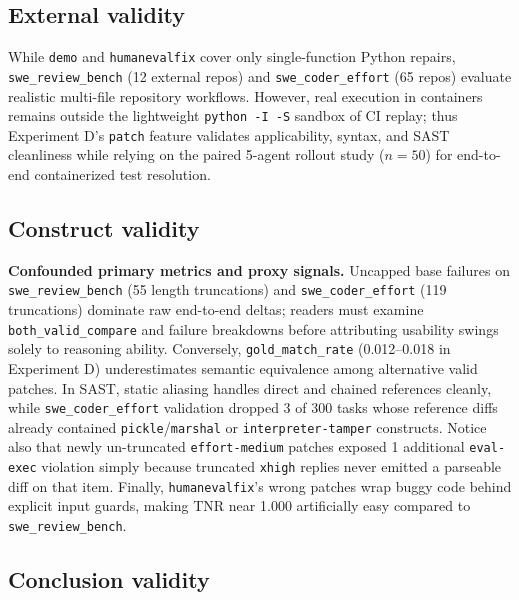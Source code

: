 \documentclass[conference]{IEEEtran}
\begin{document}
\subsection{External validity}
\label{sec:discussion-external}

While \texttt{demo} and \texttt{humanevalfix} cover only single-function Python repairs, \texttt{swe\_\allowbreak{}review\_\allowbreak{}bench} (12 external repos) and \texttt{swe\_\allowbreak{}coder\_\allowbreak{}effort} (65 repos) evaluate realistic multi-file repository workflows. However, real execution in containers remains outside the lightweight \texttt{python -{}I -{}S} sandbox of CI replay; thus Experiment D's \texttt{patch} feature validates applicability, syntax, and SAST cleanliness while relying on the paired 5-agent rollout study ($n=50$) for end-to-end containerized test resolution.

\subsection{Construct validity}
\label{sec:discussion-construct}

\textbf{Confounded primary metrics and proxy signals.} Uncapped base failures on \texttt{swe\_\allowbreak{}review\_\allowbreak{}bench} (55 length truncations) and \texttt{swe\_\allowbreak{}coder\_\allowbreak{}effort} (119 truncations) dominate raw end-to-end deltas; readers must examine \texttt{both\_\allowbreak{}valid\_\allowbreak{}compare} and failure breakdowns before attributing usability swings solely to reasoning ability. Conversely, \texttt{gold\_\allowbreak{}match\_\allowbreak{}rate} (0.012--0.018 in Experiment D) underestimates semantic equivalence among alternative valid patches. In SAST, static aliasing handles direct and chained references cleanly, while \texttt{swe\_\allowbreak{}coder\_\allowbreak{}effort} validation dropped 3 of 300 tasks whose reference diffs already contained \texttt{pickle}/\texttt{marshal} or \texttt{interpreter-{}tamper} constructs. Notice also that newly un-truncated \texttt{effort-{}medium} patches exposed 1 additional \texttt{eval-{}exec} violation simply because truncated \texttt{xhigh} replies never emitted a parseable diff on that item. Finally, \texttt{humanevalfix}'s wrong patches wrap buggy code behind explicit input guards, making TNR near 1.000 artificially easy compared to \texttt{swe\_\allowbreak{}review\_\allowbreak{}bench}.

\subsection{Conclusion validity}
\label{sec:discussion-conclusion}
\end{document}
